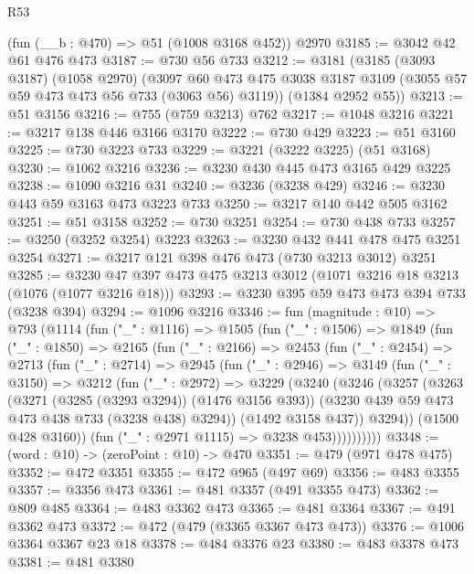 \begin{lexlean}{R53}
\begin{coremodule}
    (fun (__b : @470) => @51 (@1008 @3168 @452))
    @2970
@3185 := @3042 @42 @61 @476 @473
@3187 := @730 @56 @733
@3212 := @3181
    (@3185
      (@3093 @3187)
      (@1058 @2970)
      (@3097 @60 @473 @475 @3038 @3187 @3109 (@3055 @57 @59 @473 @473 @56 @733 (@3063 @56) @3119))
      (@1384 @2952 @55))
@3213 := @51 @3156
@3216 := @755 (@759 @3213) @762
@3217 := @1048 @3216
@3221 := @3217 @138 @446 @3166 @3170
@3222 := @730 @429
@3223 := @51 @3160
@3225 := @730 @3223 @733
@3229 := @3221 (@3222 @3225) (@51 @3168)
@3230 := @1062 @3216
@3236 := @3230 @430 @445 @473 @3165 @429 @3225
@3238 := @1090 @3216 @31
@3240 := @3236 (@3238 @429)
@3246 := @3230 @443 @59 @3163 @473 @3223 @733
@3250 := @3217 @140 @442 @505 @3162
@3251 := @51 @3158
@3252 := @730 @3251
@3254 := @730 @438 @733
@3257 := @3250 (@3252 @3254) @3223
@3263 := @3230 @432 @441 @478 @475 @3251 @3254
@3271 := @3217 @121 @398 @476 @473 (@730 @3213 @3012) @3251
@3285 := @3230 @47 @397 @473 @475 @3213 @3012 (@1071 @3216 @18 @3213 (@1076 (@1077 @3216 @18)))
@3293 := @3230 @395 @59 @473 @473 @394 @733 (@3238 @394)
@3294 := @1096 @3216
@3346 := fun (magnitude : @10) =>
  @793
    (@1114
      (fun ("_" : @1116) =>
      @1505
        (fun ("_" : @1506) =>
        @1849
          (fun ("_" : @1850) =>
          @2165
            (fun ("_" : @2166) =>
            @2453
              (fun ("_" : @2454) =>
              @2713
                (fun ("_" : @2714) =>
                @2945
                  (fun ("_" : @2946) =>
                  @3149
                    (fun ("_" : @3150) =>
                    @3212
                      (fun ("_" : @2972) =>
                      @3229
                        (@3240
                          (@3246
                            (@3257
                              (@3263
                                (@3271 (@3285 (@3293 @3294)) (@1476 @3156 @393))
                                (@3230 @439 @59 @473 @473 @438 @733 (@3238 @438) @3294))
                              (@1492 @3158 @437))
                            @3294))
                        (@1500 @428 @3160))
                      (fun ("_" : @2971 @1115) => @3238 @453))))))))))
@3348 := (word : @10) -> (zeroPoint : @10) -> @470
@3351 := @479 (@971 @478 @475)
@3352 := @472 @3351
@3355 := @472 @965 (@497 @69)
@3356 := @483 @3355
@3357 := @3356 @473
@3361 := @481 @3357 (@491 @3355 @473)
@3362 := @809 @485
@3364 := @483 @3362 @473
@3365 := @481 @3364
@3367 := @491 @3362 @473
@3372 := @472 (@479 (@3365 @3367 @473 @473))
@3376 := @1006 @3364 @3367 @23 @18
@3378 := @484 @3376 @23
@3380 := @483 @3378 @473
@3381 := @481 @3380

\end{coremodule}
\end{lexlean}
